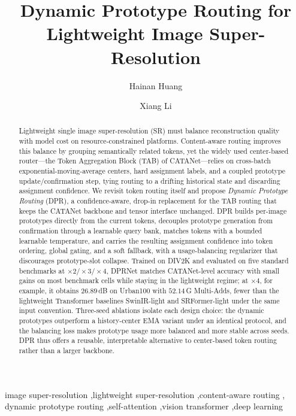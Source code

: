 \documentclass[preprint,12pt]{elsarticle}
\begin{document}
\begin{frontmatter}

\title{Dynamic Prototype Routing for Lightweight Image Super-Resolution}

\author[a]{Hainan Huang}
\author[a]{Xiang Li}



\begin{abstract}
Lightweight single image super-resolution (SR) must balance reconstruction quality with
model cost on resource-constrained platforms. Content-aware routing improves this balance
by grouping semantically related tokens, yet the widely used center-based router---the
Token Aggregation Block (TAB) of CATANet---relies on cross-batch exponential-moving-average
centers, hard assignment labels, and a coupled prototype update/confirmation step, tying
routing to a drifting historical state and discarding assignment confidence. We revisit
token routing itself and propose \emph{Dynamic Prototype Routing} (DPR), a confidence-aware,
drop-in replacement for the TAB routing that keeps the CATANet backbone and tensor interface
unchanged. DPR builds per-image prototypes directly from the current tokens, decouples
prototype generation from confirmation through a learnable query bank, matches tokens with a
bounded learnable temperature, and carries the resulting assignment confidence into token
ordering, global gating, and a soft fallback, with a usage-balancing regularizer that
discourages prototype-slot collapse. Trained on DIV2K and evaluated on five standard
benchmarks at $\times2/\times3/\times4$, DPRNet matches CATANet-level accuracy with small
gains on most benchmark cells while staying in the lightweight regime; at $\times4$, for
example, it obtains $26.89$\,dB on Urban100 with $52.14$\,G Multi-Adds, fewer than the
lightweight Transformer baselines SwinIR-light and SRFormer-light under the same input
convention. Three-seed ablations isolate each design choice: the dynamic prototypes
outperform a history-center EMA variant under an identical protocol, and the balancing loss
makes prototype usage more balanced and more stable across seeds. DPR thus offers a reusable,
interpretable alternative to center-based token routing rather than a larger backbone.
\end{abstract}

\begin{keyword}
image super-resolution \sep lightweight super-resolution \sep content-aware routing \sep
dynamic prototype routing \sep self-attention \sep vision transformer \sep deep learning
\end{keyword}

\end{frontmatter}
\end{document}
